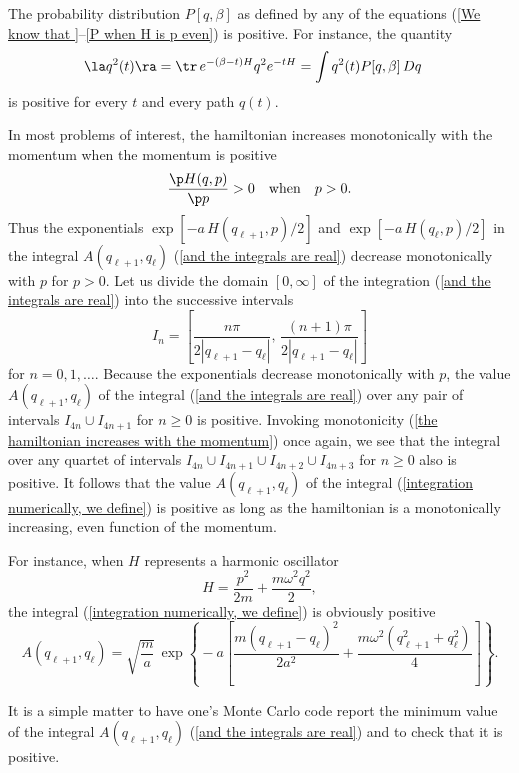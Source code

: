 \documentclass[prd,preprint,floatfix,showpacs]{revtex4-1}
\begin{document}
The probability distribution \( P[q, \beta] \) 
as defined by any of the equations 
(\ref{We know that }--\ref{P when H is p even})
is positive.
For instance, the quantity
\begin{equation} 
   \begin{split}
 \la q^2(t) \ra ={}& \tr \, e^{-(\beta - t) H } q^2 e^{-t H} 
 = \int q^2(t) P[q,\beta] \, Dq
     \end{split}
\end{equation}
is positive for every \( t \) and every 
path \( q(t) \)\@.
\par
In most problems of interest,
the hamiltonian increases monotonically
with the momentum when the momentum
is positive
\begin{equation}
\frac{\p H(q, p)}{\p p} > 0 
\quad \mbox{when} \quad p > 0 .
\label {the hamiltonian increases with the momentum}
\end{equation}
Thus
the exponentials \( \exp[ - a \, H(q_{\ell+1}, p)/2 ] \)
and \( \exp[ - a \, H(q_\ell, p)/2 ] \)
in the integral \( A(q_{\ell + 1}, q_\ell) \) 
(\ref {and the integrals are real})
decrease monotonically with \( p \)
for \( p > 0 \)\@.
Let us divide the domain \( [0, \infty ] \)
of the integration (\ref {and the integrals are real})
into the successive intervals 
\begin{equation}
I_n ={} \left[ \frac{n \pi}{2 | q_{\ell+1} - q_\ell |}, \,
 \frac{(n + 1)\pi}{2 | q_{\ell+1} - q_\ell |} \right] 
\label {if one divides the half line}
\end{equation}
for \( n = 0, 1, \dots \)\@.
Because the
exponentials decrease monotonically
with \( p \),
the value  \( A(q_{\ell + 1}, q_\ell) \)
of the integral (\ref {and the integrals are real})
over any pair of intervals
\( I_{4n} \cup I_{4n+1} \) for \( n \ge 0 \)
is positive.  Invoking monotonicity
(\ref {the hamiltonian increases with the momentum})
once again, we see that the integral over 
any quartet of intervals
\( I_{4n} \cup I_{4n+1} \cup I_{4n+2} \cup I_{4n+3}\) 
for \( n \ge 0 \) also is positive. 
It follows that the value \( A(q_{\ell + 1}, q_\ell) \) 
of the integral 
(\ref {integration numerically, we define})
is positive as long as the hamiltonian is 
a monotonically increasing, 
even function of the momentum.
\par
\par
For instance, when \( H \)
represents a harmonic oscillator
\begin{equation}
H ={} \frac{p^2}{2m} + \frac{m \omega^2 q^2}{2},
\label {H represents a harmonic oscillator}
\end{equation}
the integral 
(\ref {integration numerically, we define})
is obviously positive
\begin{equation}
A(q_{\ell+1}, q_\ell) = {} \sqrt{\frac{m}{a}}
\, \exp\left\{ {} - a 
\left[\frac{m (q_{\ell+1} - q_\ell)^2}{2 a^2}
+ \frac{m\omega^2 ( q_{\ell+1}^2 + q_\ell^2)}{4} 
\right] \right\} .
\label {the integral is}
\end{equation}
\par
It is a simple matter to
have one's Monte Carlo code
report the minimum 
value of the integral \( A(q_{\ell + 1}, q_\ell) \) 
(\ref {and the integrals are real})
and to check that it is positive.


\end{document}
